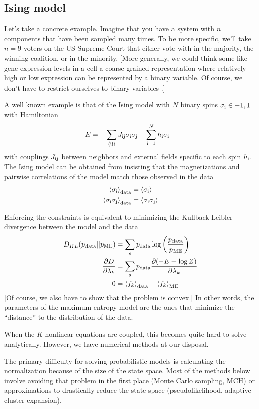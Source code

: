 \documentclass[aps,prl,twocolumn]{revtex4-1}
\begin{document}
\subsection{Ising model}
Let's take a concrete example. Imagine that you have a system with $n$ components that have been sampled many times. To be more specific, we'll take $n=9$ voters on the US Supreme Court that either vote with in the majority, the winning coalition, or in the minority. [More generally, we could think some like gene expression levels in a cell a coarse-grained representation where relatively high or low expression can be represented by a binary variable. Of course, we don't have to restrict ourselves to binary variables \cite{Lezon:2006ws}.]

A well known example is that of the Ising model with $N$ binary spins $\sigma_{\rm i} \in {-1,1}$ with Hamiltonian 
\begin{align}
	E &= -\sum_{\left<\rm ij\right>} J_{\rm ij}\sigma_{\rm i}\sigma_{\rm j} -\sum_{\rm i=1}^N h_{\rm i}\sigma_{\rm i}
\end{align}
with couplings $J_{\rm ij}$ between neighbors and external fields specific to each spin $h_{\rm i}$. The Ising model can be obtained from insisting that the magnetizations and pairwise correlations of the model match those observed in the data
\begin{align}
	\left<\sigma_{\rm i}\right>_{\rm data} &= \left<\sigma_{\rm i}\right>\\
	\left<\sigma_{\rm i}\sigma_{\rm j}\right>_{\rm data} &= \left<\sigma_{\rm i}\sigma_{\rm j}\right>
\end{align}

Enforcing the constraints is equivalent to minimizing the Kullback-Leibler divergence between the model and the data \cite{Cover:2006tl}
\begin{align}
	D_{KL}(p_{\rm data}||p_{\rm ME}) &= \sum_s p_{\rm data} \log\left(\frac{p_{\rm data}}{p_{\rm ME}}\right)\\
	\frac{\partial D}{\partial \lambda_k} &= \sum_s p_{\rm data} \frac{\partial (-E-\log Z)}{\partial \lambda_k}\\
	0 &= \left<f_k\right>_{\rm data} -\left<f_k\right>_{\rm ME}
\end{align}
[Of course, we also have to show that the problem is convex.] In other words, the parameters of the maximum entropy model are the ones that minimize the ``distance'' to the distribution of the data.

When the $K$ nonlinear equations are coupled, this becomes quite hard to solve analytically. However, we have numerical methods at our disposal.

The primary difficulty for solving probabilistic models is calculating the normalization because of the size of the state space. Most of the methods below involve avoiding that problem in the first place (Monte Carlo sampling, MCH) or approximations to drastically reduce the state space (pseudolikelihood, adaptive cluster expansion).
\end{document}
